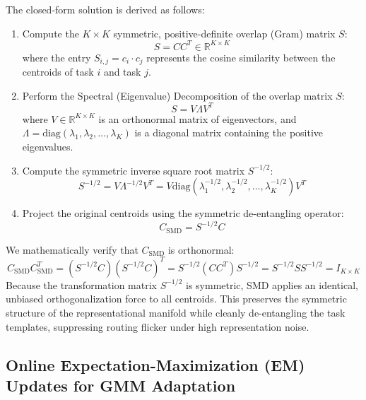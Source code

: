 The closed-form solution is derived as follows:
\begin{enumerate}
    \item Compute the $K \times K$ symmetric, positive-definite overlap (Gram) matrix $S$:
    \begin{equation}
        S = C C^T \in \mathbb{R}^{K \times K}
    \end{equation}
    where the entry $S_{i, j} = c_i \cdot c_j$ represents the cosine similarity between the centroids of task $i$ and task $j$.
    \item Perform the Spectral (Eigenvalue) Decomposition of the overlap matrix $S$:
    \begin{equation}
        S = V \Lambda V^T
    \end{equation}
    where $V \in \mathbb{R}^{K \times K}$ is an orthonormal matrix of eigenvectors, and $\Lambda = \text{diag}(\lambda_1, \lambda_2, \dots, \lambda_K)$ is a diagonal matrix containing the positive eigenvalues.
    \item Compute the symmetric inverse square root matrix $S^{-1/2}$:
    \begin{equation}
        S^{-1/2} = V \Lambda^{-1/2} V^T = V \text{diag}\left(\lambda_1^{-1/2}, \lambda_2^{-1/2}, \dots, \lambda_K^{-1/2}\right) V^T
    \end{equation}
    \item Project the original centroids using the symmetric de-entangling operator:
    \begin{equation}
        C_{\text{SMD}} = S^{-1/2} C
    \end{equation}
\end{enumerate}

We mathematically verify that $C_{\text{SMD}}$ is orthonormal:
\begin{equation}
    C_{\text{SMD}} C_{\text{SMD}}^T = (S^{-1/2} C) (S^{-1/2} C)^T = S^{-1/2} (C C^T) S^{-1/2} = S^{-1/2} S S^{-1/2} = I_{K \times K}
\end{equation}
Because the transformation matrix $S^{-1/2}$ is symmetric, SMD applies an identical, unbiased orthogonalization force to all centroids. This preserves the symmetric structure of the representational manifold while cleanly de-entangling the task templates, suppressing routing flicker under high representation noise.

\subsection{Online Expectation-Maximization (EM) Updates for GMM Adaptation}
\label{sec:appendix_em}

